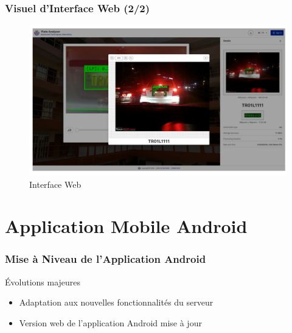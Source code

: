 \documentclass[
	11pt,
	aspectratio=169,
]{beamer}
\begin{document}
\begin{frame}
	\frametitle{Visuel d'Interface Web (2/2)}
	
	\begin{figure}
		\includegraphics[width=0.9\linewidth]{Images/image2.png}
		\caption{Interface Web}
	\end{figure}
\end{frame}




\section{Application Mobile Android}

\begin{frame}
	\frametitle{Mise à Niveau de l'Application Android}
	
	\begin{block}{Évolutions majeures}
		\begin{itemize}
			\item Adaptation aux nouvelles fonctionnalités du serveur
			\item Version web de l'application Android mise à jour
		\end{itemize}
	\end{block}
	
	
\end{frame}
\end{document}
